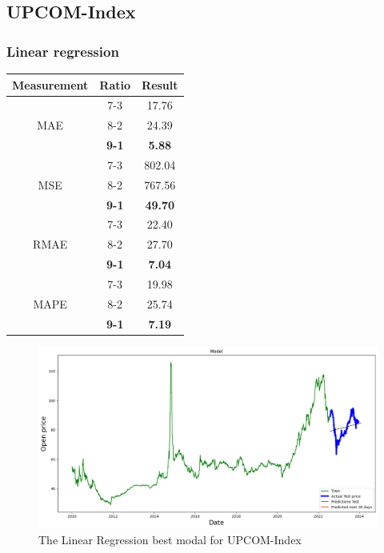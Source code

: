 \documentclass{ieeeojies}
\begin{document}
\subsection{UPCOM-Index}
\subsubsection{Linear regression}
\begin{table}[H]
    \centering
    \begin{tabular}{|c|c|c|}
        \hline
         Measurement & Ratio &  Result  \\
        \hline
             & 7-3 & 17.76 \\
        MAE  & 8-2 & 24.39  \\
            & \textbf{9-1} & \textbf{5.88} \\
        \hline
           & 7-3 & 802.04  \\
        MSE  & 8-2 & 767.56 \\
            & \textbf{9-1} & \textbf{49.70}  \\
        \hline
           & 7-3 & 22.40 \\
        RMAE  & 8-2 & 27.70  \\
            & \textbf{9-1} & \textbf{7.04} \\
        \hline
           & 7-3 & 19.98  \\
        MAPE  & 8-2 & 25.74  \\
            & \textbf{9-1} & \textbf{7.19} \\
        \hline
    \end{tabular}
    \label{table:example}
\end{table}
\begin{figure}[H]
    \centering
    \includegraphics[width=0.8\linewidth]{LINEAR UPCOM 91.jpg}
    \caption{The Linear Regression best modal for UPCOM-Index}
    \label{fig:example}
\end{figure}
\end{document}
